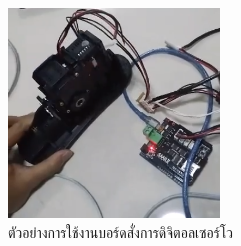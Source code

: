 \begin{figure}[!ht]
    \centering
    \includegraphics[width=0.5\textwidth]{chapter3/images/clean/uthai_drive.png}
    \caption{ตัวอย่างการใช้งานบอร์ดสั่งการดิจิตอลเซอร์โว}
    \label{fig:uthai_drive}
\end{figure}




